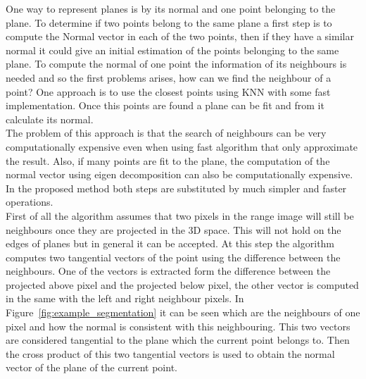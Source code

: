 \documentclass[fontsize=12pt]{article}
\begin{document}
One way to represent planes is by its normal and one point belonging to the plane. To determine if two points belong to the same plane a first step is to compute the Normal vector in each of the two points, then if they have a similar normal it could give an initial estimation of the points belonging to the same plane.  To compute the normal of one point the information of its neighbours is needed and so  the first problems arises, how can we find the neighbour of a point? One approach is to use the closest points using KNN with some fast implementation. Once this points are found a plane can be fit and from it calculate its normal.\\

The problem of this approach is that the search of neighbours can be very computationally expensive even when using fast algorithm that only approximate the result. Also, if many points are fit to the plane, the computation of the normal vector using eigen decomposition can also be computationally expensive. \\

In the proposed method both steps are substituted by much simpler and faster operations.\\

First of all the algorithm assumes that two pixels in the range image will still be neighbours once they are projected in the 3D space. This will not hold on the edges of planes but in general it can be accepted. At this step the algorithm computes two tangential vectors of the point using the difference between the neighbours. One of the vectors is extracted form the difference between the projected above pixel and the projected below pixel, the other vector is computed in the same with the left and right neighbour pixels. In Figure~\ref{fig:example_segmentation} it can be seen which are the neighbours of one pixel and how the normal is consistent with this neighbouring. This two vectors are considered tangential to the plane which the current point belongs to. Then the cross product of this two tangential vectors is used to obtain the normal vector of the plane of the current point.\\
\end{document}
